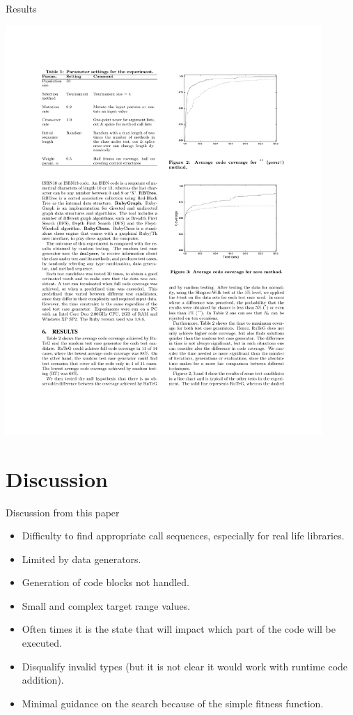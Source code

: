 \documentclass{beamer}
\begin{document}
\begin{frame}{Results}
  \begin{center}
    \includegraphics[width=0.9\textwidth]{ruteg_fig3}
  \end{center}
\end{frame}


\section{Discussion}
\begin{frame}{Discussion from this paper}
  \begin{itemize}
    \item Difficulty to find appropriate call sequences, especially for real life libraries.
    \item Limited by data generators.
    \item Generation of code blocks not handled.
    \item Small and complex target range values.
    \item Often times it is the state that will impact which part of the code will be executed.
  \end{itemize}
  \begin{itemize}
    \item Disqualify invalid types (but it is not clear it would work with runtime code addition).
    \item Minimal guidance on the search because of the simple fitness function.
  \end{itemize}
\end{frame}
\end{document}
